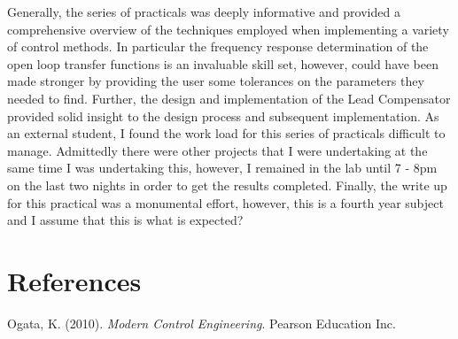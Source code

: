 \documentclass{article}
\begin{document}
Generally, the series of practicals was deeply informative and provided a comprehensive overview of the techniques employed when implementing a variety of control methods. In particular the frequency response determination of the open loop transfer functions is an invaluable skill set, however, could have been made stronger by providing the user some tolerances on the parameters they needed to find. Further, the design and implementation of the Lead Compensator provided solid insight to the design process and subsequent implementation. As an external student, I found the work load for this series of practicals difficult to manage. Admittedly there were other projects that I were undertaking at the same time I was undertaking this, however, I remained in the lab until 7 - 8pm on the last two nights in order to get the results completed. Finally, the write up for this practical was a monumental effort, however, this is a fourth year subject and I assume that this is what is expected? 

\newpage

\section{References}
Ogata, K. (2010). \textit{Modern Control Engineering}. Pearson Education Inc.
\end{document}
